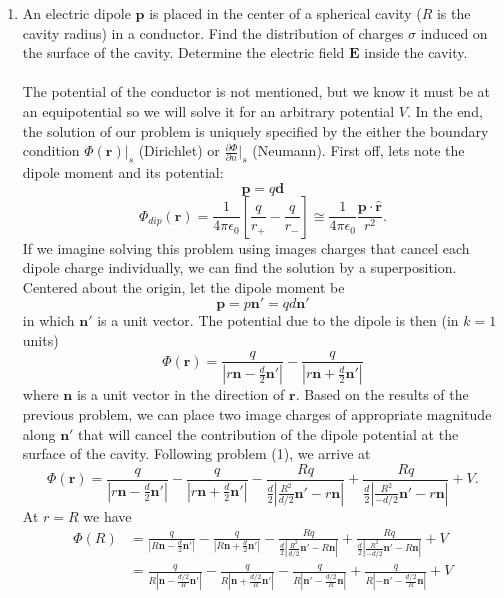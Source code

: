 \documentclass[11pt,letterpaper]{article}
\newcommand{\vect}[1]{\mathbf{#1}}
\begin{document}
\begin{enumerate}
  \item An electric dipole $\vect p$ is placed in the center of a spherical cavity ($R$ is the cavity radius) in a conductor. Find the distribution of charges $\sigma$ induced on the surface of the cavity. Determine the electric field $\vect E$ inside the cavity.
  \\ \\The potential of the conductor is not mentioned, but we know it must be at an equipotential so we will solve it for an arbitrary potential $V$. In the end, the solution of our problem is uniquely specified by the either the boundary condition $\Phi(\vect r)|_{s}$ (Dirichlet) or $\frac{\partial\Phi}{\partial n}|_{s}$ (Neumann). First off, lets note the dipole moment and its potential:
  $$\vect p = q\vect d$$
  $$\Phi_{dip}(\vect r) = \frac{1}{4\pi\epsilon_0}\left[\frac{q}{r_+}-\frac{q}{r_-}\right] \cong \frac{1}{4\pi\epsilon_0}\frac{\vect p\cdot\hat{\vect r}}{r^2}.$$
  If we imagine solving this problem using images charges that cancel each dipole charge individually, we can find the solution by a superposition. Centered about the origin, let the dipole moment be
  $$\vect p = p\vect n' = qd\vect n'$$
  in which $\vect n'$ is a unit vector. The potential due to the dipole is then (in $k=1$ units)
  $$\Phi(\vect r) = \frac{q}{|r\vect n - \frac{d}{2}\vect n'|}- \frac{q}{|r\vect n + \frac{d}{2}\vect n'|}$$
  where $\vect n$ is a unit vector in the direction of $\vect r$. Based on the results of the previous problem, we can place two image charges of appropriate magnitude along $\vect n'$ that will cancel the contribution of the dipole potential at the surface of the cavity. Following problem (1), we arrive at
   \begin{equation}\label{1}\Phi(\vect r) = \frac{q}{|r\vect n - \frac{d}{2}\vect n'|}- \frac{q}{|r\vect n + \frac{d}{2}\vect n'|} -\frac{Rq}{\frac{d}{2}|\frac{R^2}{d/2}\vect n' - r\vect n|}+\frac{Rq}{\frac{d}{2}|\frac{R^2}{-d/2}\vect n' - r\vect n|}+V.\end{equation}
   At $r=R$ we have
   \begin{align*}\Phi(R) &= \frac{q}{|R\vect n - \frac{d}{2}\vect n'|}- \frac{q}{|R\vect n + \frac{d}{2}\vect n'|} -\frac{Rq}{\frac{d}{2}|\frac{R^2}{d/2}\vect n' - R\vect n|}+\frac{Rq}{\frac{d}{2}|\frac{R^2}{-d/2}\vect n' - R\vect n|}+V\\
   &= \frac{q}{R|\vect n - \frac{d/2}{R}\vect n'|}- \frac{q}{R|\vect n + \frac{d/2}{R}\vect n'|} -\frac{q}{R|\vect n' - \frac{d/2}{R}\vect n|}+\frac{q}{R|-\vect n' - \frac{d/2}{R}\vect n|}+V\\

\end{align*}
\end{enumerate}
\end{document}
